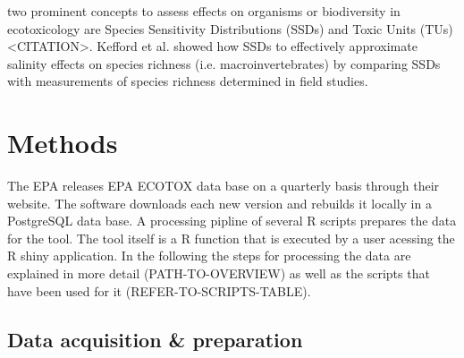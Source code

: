 \documentclass[english]{article}
\newcommand{\epa}{EPA ECOTOX data base}
\begin{document}
\citep{kefford_definition_2011} %

\citep{posthuma_species_2002} %

two prominent concepts to assess effects on organisms or biodiversity in ecotoxicology are Species Sensitivity Distributions \citep{posthuma_species_2002} (SSDs) and Toxic Units (TUs) <CITATION>. Kefford et al. \citet{kefford_definition_2011} showed how SSDs to effectively approximate salinity effects on species richness (i.e. macroinvertebrates) by comparing SSDs with measurements of species richness determined in field studies. 



\section*{Methods}


The EPA releases \epa{} on a quarterly basis through their website. The software downloads each new version and rebuilds it locally in a PostgreSQL data base. A processing pipline of several R \cite{r_core_team_r_2017} scripts prepares the data for the tool. The tool itself is a R function that is executed by a user acessing the R shiny \citep{chang_shiny_2018} application. In the following the steps for processing the data are explained in more detail (PATH-TO-OVERVIEW) as well as the scripts that have been used for it (REFER-TO-SCRIPTS-TABLE).

\subsection*{Data acquisition \& preparation}
\end{document}
